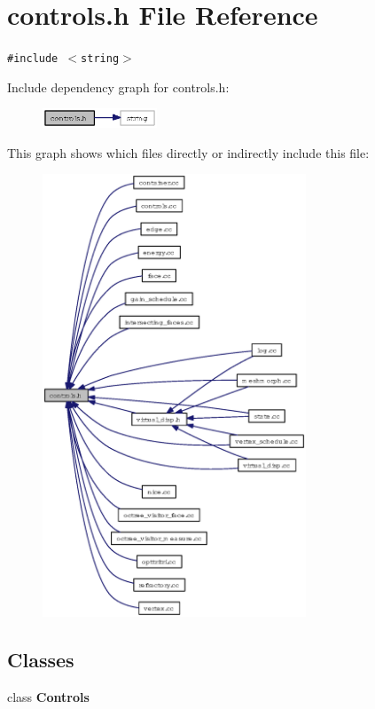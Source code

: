 \section{controls.h File Reference}
\label{controls_8h}
{\tt \#include $<$string$>$}\par


Include dependency graph for controls.h:\begin{figure}[H]
\begin{center}
\leavevmode
\includegraphics[width=97pt]{controls_8h__incl}
\end{center}
\end{figure}


This graph shows which files directly or indirectly include this file:\begin{figure}[H]
\begin{center}
\leavevmode
\includegraphics[width=223pt]{controls_8h__dep__incl}
\end{center}
\end{figure}
\subsection*{Classes}
\begin{CompactItemize}
\item 
class {\bf Controls}
\end{CompactItemize}
